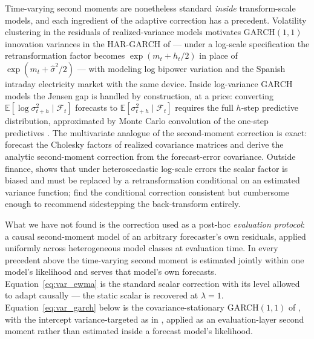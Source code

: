 Time-varying second moments are nonetheless standard \emph{inside}
transform-scale models, and each ingredient of the adaptive correction
has a precedent. Volatility clustering in the residuals of
realized-variance models motivates GARCH$(1,1)$ innovation variances
in the HAR-GARCH of \citet{CorsiMittnikPigorschPigorsch2008} ---
under a log-scale specification the retransformation factor becomes
$\exp(m_t + h_t/2)$ in place of $\exp(m_t + \hat\sigma^2/2)$ ---
with \citet{BollerslevKretschmerPigorschTauchen2009} modeling log
bipower variation and \citet{CiarretaZarraga2016} the Spanish
intraday electricity market with the same device. Inside log-variance
GARCH models the Jensen gap is handled by construction, at a price:
converting $\mathbb{E}[\log \sigma^2_{t+h} \mid \mathcal{F}_t]$
forecasts to $\mathbb{E}[\sigma^2_{t+h} \mid \mathcal{F}_t]$ requires
the full $h$-step predictive distribution, approximated by Monte Carlo
convolution of the one-step predictives
\citep{AndersenBollerslevChristoffersenDiebold2006}. The multivariate
analogue of the second-moment correction is exact: \citet{ChiriacVoev2011}
forecast the Cholesky factors of realized covariance matrices and
derive the analytic second-moment correction from the forecast-error
covariance. Outside finance, \citet{Manning1998} shows that under
heteroscedastic log-scale errors the scalar \citet{Duan1983} factor is
biased and must be replaced by a retransformation conditional on an
estimated variance function; \citet{ManningMullahy2001} find the
conditional correction consistent but cumbersome enough to recommend
sidestepping the back-transform entirely.

What we have not found is the correction used as a post-hoc \emph{evaluation protocol}: a causal second-moment model of an arbitrary
forecaster's own residuals, applied uniformly across heterogeneous
model classes at evaluation time. In every precedent above the
time-varying second moment is estimated jointly within one model's
likelihood and serves that model's own forecasts.
Equation~\eqref{eq:var_ewma} is the standard scalar correction with
its level allowed to adapt causally --- the static scalar is recovered
at $\lambda = 1$. Equation~\eqref{eq:var_garch} below is the
covariance-stationary GARCH$(1,1)$ of \citet{Bollerslev1986}, with
the intercept variance-targeted as in \citet{EngleMezrich1996},
applied as an evaluation-layer second moment rather than estimated
inside a forecast model's likelihood.

